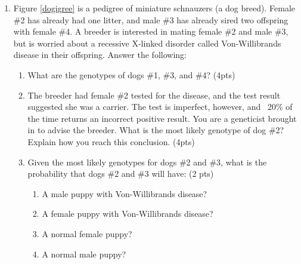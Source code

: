 \documentclass[]{article}
\begin{document}
\begin{enumerate}

\newpage
\item Figure \ref{dogigree} is a pedigree of miniature schnauzers (a dog breed). Female \#2 has already had one litter, and male \#3 has already sired two offspring with female \#4. A breeder is interested in mating female \#2 and male \#3, but is worried about a recessive X-linked disorder called Von-Willibrands disease in their offspring. Answer the following:

\begin{enumerate}
\item What are the genotypes of dogs \#1, \#3, and \#4? (4pts)
\item The breeder had female \#2 tested for the disease, and the test result suggested she was a carrier. The test is imperfect, however, and ~20\% of the time returns an incorrect positive result. You are a geneticist brought in to advise the breeder. What is the most likely genotype of dog \#2? Explain how you reach this conclusion. (4pts)
\item Given the most likely genotypes for dogs \#2 and \#3, what is the probability that dogs \#2 and \#3 will have: (2 pts)
\begin{enumerate}
\item A male puppy with Von-Willibrands disease?
\item A female puppy with Von-Willibrands disease?
\item A normal female puppy?
\item A normal male puppy?
\end{enumerate}
\end{enumerate}


\end{enumerate}
\end{document}
